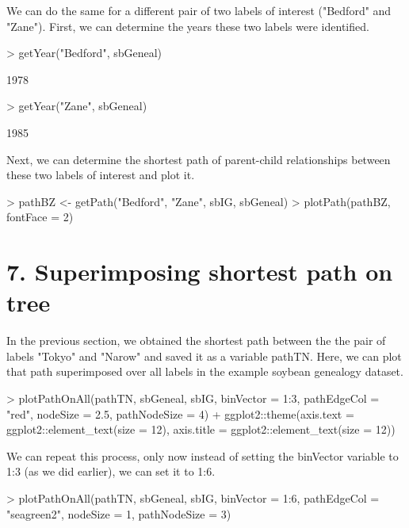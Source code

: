\documentclass{article}
\begin{document}
We can do the same for a different pair of two labels of interest ("Bedford" and "Zane"). First, we can determine the years these two labels were identified.

\begin{Schunk}
\begin{Sinput}
> getYear("Bedford", sbGeneal)
\end{Sinput}
\begin{Soutput}
[1] 1978
\end{Soutput}
\begin{Sinput}
> getYear("Zane", sbGeneal)
\end{Sinput}
\begin{Soutput}
[1] 1985
\end{Soutput}
\end{Schunk}

Next, we can determine the shortest path of parent-child relationships between these two labels of interest and plot it.

\begin{Schunk}
\begin{Sinput}
> pathBZ <- getPath("Bedford", "Zane", sbIG, sbGeneal)
> plotPath(pathBZ, fontFace = 2)
\end{Sinput}
\end{Schunk}

\section*{7. Superimposing shortest path on tree}

In the previous section, we obtained the shortest path between the the pair of labels "Tokyo" and "Narow" and saved it as a variable pathTN. Here, we can plot that path superimposed over all labels in the example soybean genealogy dataset.

\begin{Schunk}
\begin{Sinput}
> plotPathOnAll(pathTN, sbGeneal, sbIG, binVector = 1:3, pathEdgeCol = "red", nodeSize = 2.5, pathNodeSize = 4) + ggplot2::theme(axis.text = ggplot2::element_text(size = 12), axis.title = ggplot2::element_text(size = 12))
\end{Sinput}
\end{Schunk}

We can repeat this process, only now instead of setting the binVector variable to 1:3 (as we did earlier), we can set it to 1:6.

\begin{Schunk}
\begin{Sinput}
> plotPathOnAll(pathTN, sbGeneal, sbIG, binVector = 1:6, pathEdgeCol = "seagreen2", nodeSize = 1, pathNodeSize = 3)
\end{Sinput}
\end{Schunk}
\end{document}

